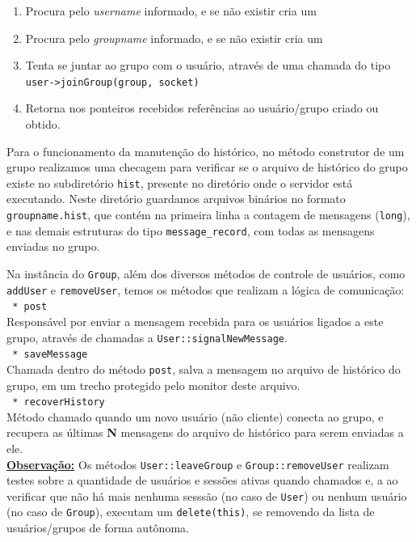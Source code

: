 \documentclass{article}
\begin{document}
\begin{enumerate}
    \item Procura pelo \textit{username} informado, e se não existir cria um
    \item Procura pelo \textit{groupname} informado, e se não existir cria um
    \item Tenta se juntar ao grupo com o usuário, através de uma chamada do tipo \texttt{user->joinGroup(group, socket)}
    \item Retorna nos ponteiros recebidos referências ao usuário/grupo criado ou obtido.
\end{enumerate}
\par Para o funcionamento da manutenção do histórico, no método construtor de um grupo realizamos uma checagem para verificar se o arquivo de histórico do grupo existe no subdiretório \texttt{hist}, presente no diretório onde o servidor está executando. Neste diretório guardamos arquivos binários no formato \texttt{groupname.hist}, que contém na primeira linha a contagem de mensagens (\texttt{long}), e nas demais estruturas do tipo \texttt{message\_record}, com todas as mensagens enviadas no grupo.
\par Na instância do \texttt{Group}, além dos diversos métodos de controle de usuários, como \texttt{addUser} e \texttt{removeUser}, temos os métodos que realizam a lógica de comunicação: 
\\\texttt{ * post}
\\ Responsável por enviar a mensagem recebida para os usuários ligados a este grupo, através de chamadas a \texttt{User::signalNewMessage}.
\\\texttt{ * saveMessage}
\\ Chamada dentro do método \texttt{post}, salva a mensagem no arquivo de histórico do grupo, em um trecho protegido pelo monitor deste arquivo.
\\\texttt{ * recoverHistory}
\\ Método chamado quando um novo usuário (não cliente) conecta ao grupo, e recupera as últimas \textbf{N} mensagens do arquivo de histórico para serem enviadas a ele.
\\ \textbf{\underline{Observação:}} Os métodos \texttt{User::leaveGroup} e \texttt{Group::removeUser} realizam testes sobre a quantidade de usuários e sessões ativas quando chamados e, a ao verificar que não há mais nenhuma sesssão (no caso de \texttt{User}) ou nenhum usuário (no caso de \texttt{Group}), executam um \texttt{delete(this)}, se removendo da lista de usuários/grupos de forma autônoma.
\end{document}
